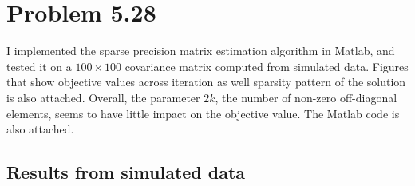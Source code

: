 \documentclass{scrartcl}
\begin{document}
\section*{Problem 5.28}

I implemented the sparse precision matrix estimation algorithm in Matlab, and tested it on a $100 \times 100$ covariance
matrix computed from simulated data. Figures that show objective values across iteration as well
sparsity pattern of the solution is also attached. Overall, the parameter $2k$, the number of non-zero off-diagonal elements, seems to
have little impact on the objective value. The Matlab code is also attached. 

\subsection*{Results from simulated data}
\end{document}
